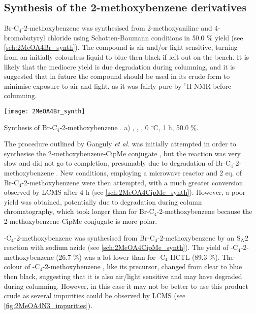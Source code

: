 
\subsection{Synthesis of the 2-methoxybenzene derivatives}

Br-C$_4$-2-methoxybenzene  was synthesised from 2-methoxyaniline  and 4-bromobutyryl chloride  using Schotten-Baumann conditions in 50.0 \% yield (see \ref{sch:2MeOA4Br_synth}). The compound is air and/or light sensitive, turning from an initially colourless liquid to blue then black if left out on the bench. It is likely that the mediocre yield is due degradation during columning, and it is suggested that in future the compound should be used in its crude form to minimise exposure to air and light, as it was fairly pure by $^{1}$H NMR before columning.

\begin{scheme}[H]
	\begin{center}
		\texttt{[image: 2MeOA4Br\_synth]}
		\caption{Synthesis of Br-C$_4$-2-methoxybenzene .
		a) , , , 0 $^{\circ}$C, 1 h, 50.0 \%.
		\label{sch:2MeOA4Br_synth}}
	\end{center}
\end{scheme}

The procedure outlined by Ganguly \textit{et al.}\cite{Ganguly2011} was initially attempted in order to synthesise the 2-methoxybenzene-CipMe conjugate , but the reaction was very slow and did not go to completion, presumably due to degradation of Br-C$_4$-2-methoxybenzene .
New conditions, employing a microwave reactor and 2 eq. of Br-C$_4$-2-methoxybenzene  were then attempted, with a much greater conversion observed by LCMS after 4 h (see \ref{sch:2MeOA4CipMe_synth}). However, a poor yield was obtained, potentially due to degradation during column chromatography, which took longer than for Br-C$_4$-2-methoxybenzene  because the 2-methoxybenzene-CipMe conjugate  is more polar.

-C$_4$-2-methoxybenzene  was synthesised from Br-C$_4$-2-methoxybenzene  by an S$_N$2 reaction with sodium azide (see \ref{sch:2MeOA4CipMe_synth}). The yield of -C$_4$-2-methoxybenzene  (26.7 \%) was a lot lower than for -C$_4$-HCTL  (89.3 \%). The colour of -C$_4$-2-methoxybenzene , like its precursor, changed from clear to blue then black, suggesting that it is also air/light sensitive and may have degraded during columning. However, in this case it may not be better to use this product crude as several impurities could be observed by LCMS (see \ref{fig:2MeOA4N3_impurities}).

